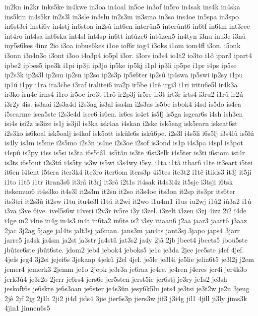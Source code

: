 {in2kn
in2kr
inks5ke
in4kwe
in3oa
in4oal
in5oe
in3of
in5ro
in4sak
ins4k
in4ska
ins5kin
in4s5kr
in2s3l
in3sle
in3slu
in2s3m
in3sma
in3so
ins4oe
in5spa
in3spo
in6st3ei
insti6v
in4stj
in6stoa
in2sû
int6en
interûn5
interûnt6
in6tf
in6tm
int3ree
int4ro
int4sa
int6ska
int4sl
int4sp
in6tt
intûze6
intûzen5
in4tyn
i3nu
inu3e
i3nú
iny5s6kes
4inz
2io
i3oa
iobus6kes
i1oe
iof6r
iog4
i3oks
i1om
iom4fl
i3on.
i5onk
i3onn
i3o4n3o
i3ont
i3oo
i4o3p4
io5pl
i3or.
i3ors
io3s4
io1t2
io3to
i1ô
ipar3
ipart4
ipbe2
ipbes5
ipe3k
i1pi
ip3ji
ip3jo
ip5ke
ip5kj
i1pl
ip3li
ip5pe
i1pr
i4ps
ip5se
ip2s3k
ip2s3l
ip2sm
ip2sn
ip2so
ip2s3p
ip5s6ter
ip2sû
ip4swa
ip5swi
ip2sy
i1pu
ip1ú
i1py
i1ra
ira3che
i3raf
iralitei6
ira2p
ir5be
i1rê
irgi3
i1ri
iritu6e5l
ir4k3a
ir3ko
irn4e
irns4
i1ro
ir5oe
iro3t
i1rô
ir2p3j
ir5re
ir3t
irt3r
irts4
i3ru2
i1rû
ir2ú
i3r2y
4is.
is3aai
i2s3a4d
i2s3ag
is3al
isa4m
i2s3as
is5be
isbok4
i4sd
is5do
is4ea
i5searme
isea5ste
i2s3e4d
isee6
is6en.
is6es
is4et
is5fj
is5ga
isgear6s
i4sh
ish3en
isi4s
isi2z
is3ize
is1j
is3jil
is3ka
isk4aa
i4skan
i2ske
isk5eag
isk5earn
iskeat6st
i2s3ko
is6koal
isk5oalj
is4kof
isk5ott
iskûle6s
iskû6pe.
i2s3l
i4s5li
i6s5lj
i3s4lû
is5lú
is4ly
is3m
is5me
i2s5mo
i2s3n
is4ne
i2s3oe
i2sof
is3ond
is1p
i4s3pa
i4spl
is3pot
i4spû
is2py
i4ss
is5si
is3ta
i6s5tâl.
is5tân
is3te
i6st3elk
i4s5ter
is3ti
i6stom
ist4r
is3ts
i6s5tut
i2s3tú
i4s5ty
is3w
is5wi
i3s4wy
i5sy.
i1ta
i1tâ
itbar6
i1te
it3eart
i5tei
it6en
i4tent
i5tera
iter3k4
ite3ro
iter6om
iters3p
4i5tes
ite3t2
i1tê
itiids3
it3j
it5ji
i1to
i1tô
i1tr
itran3s6
it3râ
it3rj
it3rô
i2t1s
it4sak
it4s3i4z
it5sje
i3tsji
i6tsk
itskemuo6
it4s3ko
it4s3l
it2s3m
it2sn
it2so
it3s4oe
its3on
it2sp
its3pr
its6ter
its3tri
it2s3û
it2sw
i1tu
itu4e3l
i1tú
it2wi
it2wo
i1u4m1
i1us
iu2wj
i1û2
iû3a2
i1ú
i3va
i3ve
6ive.
ivel5s6w
i4veri
i2v3r
iv5re
i3y
i3zel.
i3zelt
i3zen
i3zj
4izz
2ï2
ï4de
ï4ge
ïn2
ï4ne
ïn4g
ïn4s3
ïn4t
ïn6ta2
ïn6te
ïs2
ï3sy
ïtiaan6
j2aa
jaar3
jaart6
j3aaz
2jac
3j2ag
5jage
jal4ts
jalt3sj
ja6man.
jans3m
jan4ts
jant3sj
3japo
japs4
3jarr
jarre5
ja4sk
ja4sm
ja2st
ja3str
ja4stû
jat3s2
ja4y
2jâ
2jb
jbeet4
jbeets5
jbou5ste
jbûtse6ste
jbût6ste.
jdom2
jeb4
jebok4
jeboks5
je1c
je3da
2jee
jee5ste
j4ef
4jef.
4jefs
jeg4
3j2ei
jejei6s
3jekaap
4jekû
j2el
4jel.
je5le
je3l4i
je5lie
jelin6t5
je3l2j
j2em
jemer4
jemerk3
2jemm
je1o
2jepk
je3r3a
je6raa
je4re.
je4ren
j4eres
jer4i
jer4k3o
jerk3û4
je3r2o
2jerr
je6rs4
jers6e
jer5sten
jerst5ic
jer6stj
je3ry
je1s2
je3sh
jeskoft6s
je6skre
je6s3oan
je6ster
je4s3ûn
jesy6k5lu
jets4
je3tsi
je3t2w
je2u
3jeug
2jê
2jf
2jg
2j1h
2ji2
ji4d
jids4
3jie
jier6s3p
jiers3w
jif3
j3i4g
jil1
4jill
ji3ly
jims3k
4jin1
jinnen6s5
}
